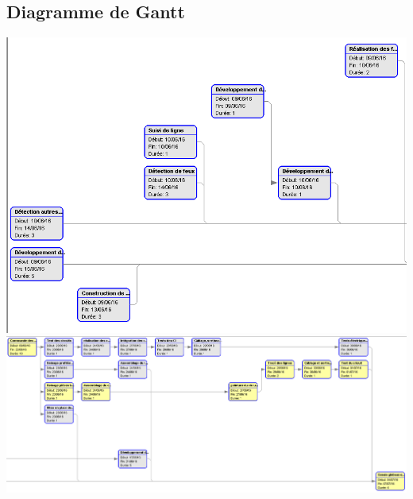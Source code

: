 \newpage
\subsection{Diagramme de Gantt}\label{PERT}
	
	\includegraphics[angle=90,origin=c,scale=0.9]{Graphics/PERT1.png}
	\newpage
	\includegraphics[angle=90,origin=c,scale=0.6]{Graphics/PERT2.png}
